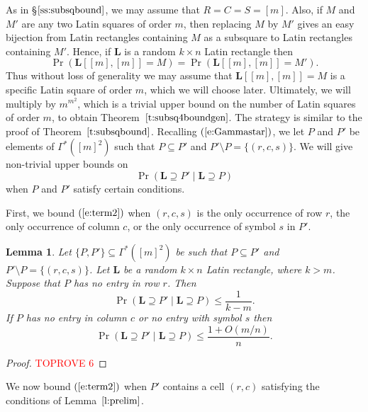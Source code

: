 \documentclass[12pt]{article}
\newtheorem{lem}[thm]{Lemma}
\theoremstyle{definition}
\numberwithin{equation}{section}
\def\eref#1{$(\ref{#1})$}
\def\sref#1{\S$\ref{#1}$}
\def\lref#1{Lemma~$\ref{#1}$}
\def\tref#1{Theorem~$\ref{#1}$}
\renewcommand{\leq}{\leqslant}
\renewcommand{\L}{\mathbf{L}}
\begin{document}
	As in \sref{ss:subsqbound}, we may assume that $R=C=S=[m]$. 
	Also, if $M$ and $M'$ are any two Latin squares of order $m$, then
	replacing $M$ by $M'$ gives an easy bijection from Latin rectangles
	containing $M$ as a subsquare to Latin rectangles containing $M'$. Hence,
	if $\L$ is a random $k \times n$ Latin rectangle then
	\begin{equation}\label{e:swapM}
		\Pr(\L[[m], [m]] = M) = \Pr(\L[[m], [m]] = M').
	\end{equation}
	Thus without loss of
	generality we may assume that $\L[[m],[m]]=M$ is a specific Latin square
	of order $m$, which we will choose later. Ultimately, we will multiply
	by $m^{m^2}$, which is a trivial upper bound on the number of Latin
	squares of order $m$, to obtain \tref{t:subsq4boundgen}.	
	The strategy is similar to the proof of \tref{t:subsqbound}.
	Recalling \eref{e:Gammastar}, we let
	$P$ and $P'$ be elements of $\Gamma^*([m]^2)$ such that $P \subseteq
	P'$ and $P'\setminus P=\{(r, c, s)\}$. We will give non-trivial upper
	bounds on
	\begin{equation}\label{e:term2}
		\Pr(\L \supseteq P' \mid  \L \supseteq P)	
	\end{equation}
	when $P$ and $P'$ satisfy certain conditions. 
	
	First, we bound \eref{e:term2} when $(r, c, s)$ is the only occurrence
	of row $r$, the only occurrence of column $c$, or the only occurrence
	of symbol $s$ in $P'$.
	
	\begin{lem}\label{l:newrcs}
		Let $\{P, P'\} \subseteq \Gamma^*([m]^2)$ be such that $P \subseteq
		P'$ and $P' \setminus P = \{(r, c, s)\}$. Let $\L$ be a random
		$k\times n$ Latin rectangle, where $k>m$. Suppose that $P$ has no
		entry in row $r$. Then
		\begin{equation*}
			\Pr(\L \supseteq P' \mid  \L \supseteq P) \leq \frac1{k-m}.
		\end{equation*}
		If $P$ has no entry in column $c$ or no entry with symbol $s$ then
		\begin{equation*}
			\Pr(\L \supseteq P' \mid  \L \supseteq P) \leq \frac{1+O(m/n)}n.
		\end{equation*}
	\end{lem}
	
	\begin{proof}\textcolor{red}{TOPROVE 6}\end{proof}
	
	We now bound \eref{e:term2} when $P'$ contains a cell $(r,c)$
	satisfying the conditions of \lref{l:prelim}.
	
\end{document}
